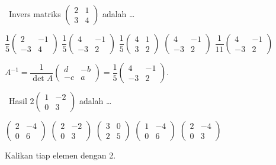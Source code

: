 \documentclass[11pt,a4paper]{exam}
\newcommand{\Inter}{{\footnotesize\textsf{\textcolor{biru}{[Intermediate]}}}\ }
\begin{document}
\begin{questions}
\question \Inter Invers matriks $\begin{pmatrix} 2 & 1\\ 3 & 4 \end{pmatrix}$ adalah \dots
\begin{choices}
\choice $\dfrac{1}{5}\begin{pmatrix} 2 & -1\\ -3 & 4 \end{pmatrix}$
\CorrectChoice $\dfrac{1}{5}\begin{pmatrix} 4 & -1\\ -3 & 2 \end{pmatrix}$
\choice $\dfrac{1}{5}\begin{pmatrix} 4 & 1\\ 3 & 2 \end{pmatrix}$
\choice $\begin{pmatrix} 4 & -1\\ -3 & 2 \end{pmatrix}$
\choice $\dfrac{1}{11}\begin{pmatrix} 4 & -1\\ -3 & 2 \end{pmatrix}$
\end{choices}
\begin{solution}$A^{-1}=\dfrac{1}{\det A}\begin{pmatrix} d & -b\\ -c & a \end{pmatrix}
= \dfrac{1}{5}\begin{pmatrix} 4 & -1\\ -3 & 2 \end{pmatrix}.$\end{solution}

\question \Inter Hasil $2\begin{pmatrix} 1 & -2\\ 0 & 3 \end{pmatrix}$ adalah \dots
\begin{choices}
\CorrectChoice $\begin{pmatrix} 2 & -4\\ 0 & 6 \end{pmatrix}$
\choice $\begin{pmatrix} 2 & -2\\ 0 & 3 \end{pmatrix}$
\choice $\begin{pmatrix} 3 & 0\\ 2 & 5 \end{pmatrix}$
\choice $\begin{pmatrix} 1 & -4\\ 0 & 6 \end{pmatrix}$
\choice $\begin{pmatrix} 2 & -4\\ 0 & 3 \end{pmatrix}$
\end{choices}
\begin{solution}Kalikan tiap elemen dengan 2.\end{solution}


\end{questions}
\end{document}
